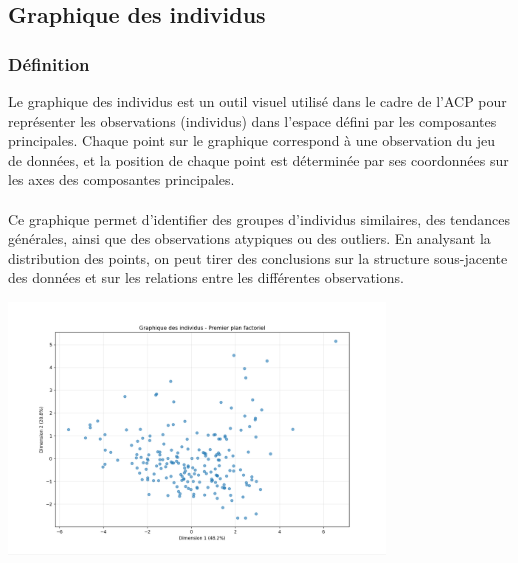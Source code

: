 \documentclass[11pt]{scrartcl}
\begin{document}

        \subsection{Graphique des individus}
            \subsubsection{Définition}
                Le graphique des individus est un outil visuel utilisé dans le cadre de l'ACP pour représenter les observations (individus) dans l'espace défini par les composantes principales. Chaque point sur le graphique correspond à une observation du jeu de données, et la position de chaque point est déterminée par ses coordonnées sur les axes des composantes principales.\\\\
                Ce graphique permet d'identifier des groupes d'individus similaires, des tendances générales, ainsi que des observations atypiques ou des outliers. En analysant la distribution des points, on peut tirer des conclusions sur la structure sous-jacente des données et sur les relations entre les différentes observations. 

                \begin{center}
                    \includegraphics[width=0.75\textwidth]{images/graphiques_des_individus.png}
                \end{center}
\end{document}
